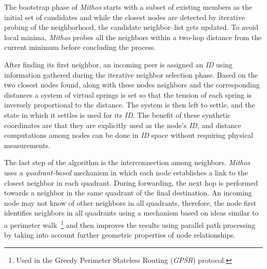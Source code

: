 The bootstrap phase of \emph{Mithos} starts with a subset 
of existing members as the initial set of candidates and 
while the closest nodes are detected by iterative
probing of the neighborhood, the candidate neighbor--list gets updated. 
To avoid local minima, \emph{Mithos} probes all the neighbors 
within a two-hop distance from the current minimum 
before concluding the process.

After finding its first neighbor, an 
incoming peer is assigned 
an \emph{ID} using information gathered during 
the iterative neighbor selection phase. 
Based on the two closest nodes found, along with these nodes neighbors and the corresponding
distances a system of virtual springs is set so that the tension of each spring
is inversely proportional to the distance. 
The system is then left to settle,
and the state in which it settles is used for its \emph{ID}. 
The benefit of these synthetic coordinates are that
they are explicitly used as the node's \emph{ID}, 
and distance computations among nodes
can be done in \emph{ID} space without requiring physical measurements.

The last step of the algorithm is the 
interconnection among neighbors. 
\emph{Mithos} uses a \emph{quadrant-based} mechanism in which 
each node establishes a link to the closest neighbor in each quadrant. 
During forwarding, the next hop is performed towards a neighbor 
in the same quadrant of the final destination. 
An incoming node may not know of other neighbors in all
quadrants, therefore, the node first identifies neighbors in all quadrants
using a mechanism based on ideas similar to a perimeter walk~\footnote{Used in
the Greedy Perimeter Stateless Routing (\emph{GPSR}) protocol.}  %
and then improves the results using parallel path processing 
by taking into account further geometric properties of node relationships.

